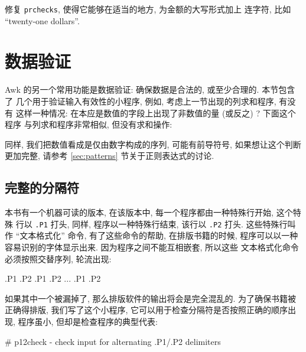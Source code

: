 \begin{shell}
\begin{exercise}
    修复 \verb'prchecks', 使得它能够在适当的地方, 为金额的大写形式加上
    连字符, 比如 ``twenty-one dollars''.
\end{exercise}

\section{数据验证}
\label{sec:data_validation}

Awk 的另一个常用功能是数据验证: 确保数据是合法的, 或至少合理的. 本节包含了
几个用于验证输入有效性的小程序, 例如, 考虑上一节出现的列求和程序, 有没有
这样一种情况: 在本应是数值的字段上出现了非数值的量 (或反之) ? 下面这个程序 
与列求和程序非常相似, 但没有求和操作:
同样, 我们把数值看成是仅由数字构成的序列, 可能有前导符号, 如果想让这个判断
更加完整, 请参考 \ref{sec:patterns} 节关于正则表达式的讨论.

\subsection{完整的分隔符}
\label{subsec:balanced_delimiters}

本书有一个机器可读的版本, 在该版本中, 每一个程序都由一种特殊行开始,
这个特殊
行以 \verb'.P1' 打头, 同样, 程序以一种特殊行结束, 该行以 \verb'.P2' 打头.
这些特殊行叫作 ``文本格式化'' 命令, 有了这些命令的帮助, 在排版书籍的时候,
程序可以以一种容易识别的字体显示出来. 因为程序之间不能互相嵌套, 所以这些 
文本格式化命令必须按照交替序列, 轮流出现:
\begin{shell}
    .P1 .P2 .P1 .P2 ... .P1 .P2
\end{shell}
如果其中一个被漏掉了, 那么排版软件的输出将会是完全混乱的. 为了确保书籍被
正确得排版, 我们写了这个小程序, 它可以用于检查分隔符是否按照正确的顺序出现,
程序虽小, 但却是检查程序的典型代表:
\begin{awkcode}
    # p12check - check input for alternating .P1/.P2 delimiters
    

\end{awkcode}
\end{shell}
